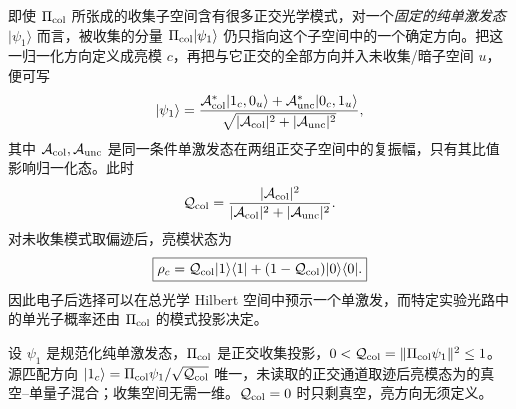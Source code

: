 \begin{proposition}[纯单激发的源匹配亮模与收集约化]
即使 $\Pi_{\rm col}$ 所张成的收集子空间含有很多正交光学模式，对一个\emph{固定的纯单激发态} $|\psi_1\rangle$ 而言，被收集的分量 $\Pi_{\rm col}|\psi_1\rangle$ 仍只指向这个子空间中的一个确定方向。把这一归一化方向定义成亮模 $c$，再把与它正交的全部方向并入未收集/暗子空间 $u$，便可写
\[
|\psi_1\rangle
=\frac{\mathcal A_{\rm col}^*|1_c,0_u\rangle
+\mathcal A_{\rm unc}^*|0_c,1_u\rangle}
{\sqrt{|\mathcal A_{\rm col}|^2+|\mathcal A_{\rm unc}|^2}},
\]
其中 $\mathcal A_{\rm col},\mathcal A_{\rm unc}$ 是同一条件单激发态在两组正交子空间中的复振幅，只有其比值影响归一化态。此时
\[
\mathcal Q_{\rm col}
=\frac{|\mathcal A_{\rm col}|^2}
{|\mathcal A_{\rm col}|^2+|\mathcal A_{\rm unc}|^2}.
\]
对未收集模式取偏迹后，亮模状态为
\begin{equation}
\boxed{
\rho_c
=\mathcal Q_{\rm col}|1\rangle\langle1|
+(1-\mathcal Q_{\rm col})|0\rangle\langle0|.}
\label{eq:collected_bright_mode_state_dp68}
\end{equation}
因此电子后选择可以在总光学 Hilbert 空间中预示一个单激发，而特定实验光路中的单光子概率还由 $\Pi_{\rm col}$ 的模式投影决定。



设 $\psi_1$ 是规范化纯单激发态，$\Pi_{\rm col}$ 是正交收集投影，$0<\mathcal Q_{\rm col}=\|\Pi_{\rm col}\psi_1\|^2\le1$。源匹配方向 $|1_c\rangle=\Pi_{\rm col}\psi_1/\sqrt{\mathcal Q_{\rm col}}$ 唯一，未读取的正交通道取迹后亮模态为的真空--单量子混合；收集空间无需一维。$\mathcal Q_{\rm col}=0$ 时只剩真空，亮方向无须定义。
\end{proposition}
